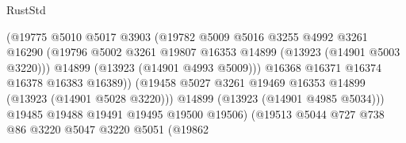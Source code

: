\begin{lexlean}{RustStd}
\begin{coremodule}
                                          (@19775
                                            @5010
                                            @5017
                                            @3903
                                            (@19782
                                              @5009
                                              @5016
                                              @3255
                                              @4992
                                              @3261
                                              @16290
                                              (@19796
                                                @5002
                                                @3261
                                                @19807
                                                @16353
                                                @14899
                                                (@13923 (@14901 @5003 @3220)))
                                              @14899
                                              (@13923 (@14901 @4993 @5009)))
                                            @16368
                                            @16371
                                            @16374
                                            @16378
                                            @16383
                                            @16389))
                                        (@19458
                                          @5027
                                          @3261
                                          @19469
                                          @16353
                                          @14899
                                          (@13923 (@14901 @5028 @3220)))
                                        @14899
                                        (@13923 (@14901 @4985 @5034)))
                                      @19485
                                      @19488
                                      @19491
                                      @19495
                                      @19500
                                      @19506)
                                    (@19513
                                      @5044
                                      @727
                                      @738
                                      @86
                                      @3220
                                      @5047
                                      @3220
                                      @5051
                                      (@19862

\end{coremodule}
\end{lexlean}
